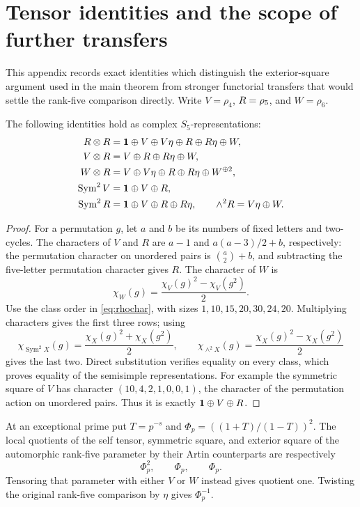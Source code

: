\section{Tensor identities and the scope of further transfers}\label{sec:functorial-identities}

This appendix records exact identities which distinguish the exterior-square argument used in the main theorem from stronger functorial transfers that would settle the rank-five comparison directly. Write $V=\rho_4$, $R=\rho_5$, and $W=\rho_6$.

\begin{proposition}\label{prop:finite-tensors}
The following identities hold as complex $S_5$-representations:
\begin{align*}
R\otimes R&=\mathbf 1\oplus V\oplus V\eta\oplus R\oplus R\eta\oplus W,\\
V\otimes R&=V\oplus R\oplus R\eta\oplus W,\\
W\otimes R&=V\oplus V\eta\oplus R\oplus R\eta\oplus W^{\oplus2},\\
\operatorname{Sym}^2V&=\mathbf 1\oplus V\oplus R,\\
\operatorname{Sym}^2R&=\mathbf 1\oplus V\oplus R\oplus R\eta,\qquad
\wedge^2R=V\eta\oplus W.
\end{align*}
\end{proposition}

\begin{proof}
For a permutation $g$, let $a$ and $b$ be its numbers of fixed letters and two-cycles. The characters of $V$ and $R$ are $a-1$ and $a(a-3)/2+b$, respectively: the permutation character on unordered pairs is $\binom a2+b$, and subtracting the five-letter permutation character gives $R$. The character of $W$ is
\[
\chi_W(g)=\frac{\chi_V(g)^2-\chi_V(g^2)}2.
\]
Use the class order in \eqref{eq:rhochar}, with sizes $1,10,15,20,30,24,20$. Multiplying characters gives the first three rows; using
\[
\chi_{\operatorname{Sym}^2 X}(g)=\frac{\chi_X(g)^2+\chi_X(g^2)}2,
\qquad
\chi_{\wedge^2 X}(g)=\frac{\chi_X(g)^2-\chi_X(g^2)}2
\]
gives the last two. Direct substitution verifies equality on every class, which proves equality of the semisimple representations. For example the symmetric square of $V$ has character $(10,4,2,1,0,0,1)$, the character of the permutation action on unordered pairs. Thus it is exactly $\mathbf 1\oplus V\oplus R$.
\end{proof}

\begin{proposition}\label{prop:tensor-cancellation}
At an exceptional prime put $T=p^{-s}$ and $\Phi_p=((1+T)/(1-T))^2$. The local quotients of the self tensor, symmetric square, and exterior square of the automorphic rank-five parameter by their Artin counterparts are respectively
\[
\Phi_p^2,\qquad\Phi_p,\qquad\Phi_p.
\]
Tensoring that parameter with either $V$ or $W$ instead gives quotient one. Twisting the original rank-five comparison by $\eta$ gives $\Phi_p^{-1}$.
\end{proposition}

